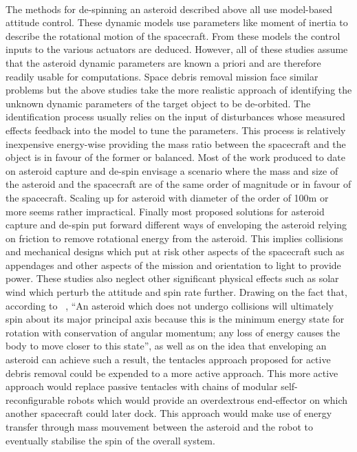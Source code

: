 \paragraph{}The methods for de-spinning an asteroid described above all use model-based attitude control. These dynamic models use parameters like moment of inertia to describe the rotational motion of the spacecraft. From these models the control inputs to the various actuators are deduced. However, all of these studies assume that the asteroid dynamic parameters are known a priori and are therefore readily usable for computations. Space debris removal mission face similar problems but the above studies take the more realistic approach of identifying the unknown dynamic parameters of the target object to be de-orbited. The identification process usually relies on the input of disturbances whose measured effects feedback into the model to tune the parameters. This process is relatively inexpensive energy-wise providing the mass ratio between the spacecraft and the object is in favour of the former or balanced. Most of the work produced to date on asteroid capture and de-spin envisage a scenario where the mass and size of the asteroid and the spacecraft are of the same order of magnitude or in favour of the spacecraft. Scaling up for asteroid with diameter of the order of 100m or more seems rather impractical. Finally most proposed solutions for asteroid capture and de-spin put forward different ways of enveloping the asteroid relying on friction to remove rotational energy from the asteroid. This implies collisions and mechanical designs which put at risk other aspects of the spacecraft such as appendages and other aspects of the mission and orientation to light to provide power. These studies also neglect other significant physical effects such as solar wind which perturb the attitude and spin rate further. Drawing on the fact that, according to ~\cite{BurnsJoseph1973}, “An asteroid which does not undergo collisions will ultimately spin about its major principal axis because this is the minimum energy state for rotation with conservation of angular momentum; any loss of energy causes the body to move closer to this state”, as well as on the idea that enveloping an asteroid can achieve such a result, the tentacles approach proposed for active debris removal could be expended to a more active approach. This more active approach would replace passive tentacles with chains of modular self-reconfigurable robots which would provide an overdextrous end-effector on which another spacecraft could later dock. This approach would make use of energy transfer through mass mouvement between the asteroid and the robot to eventually stabilise the spin of the overall system.
